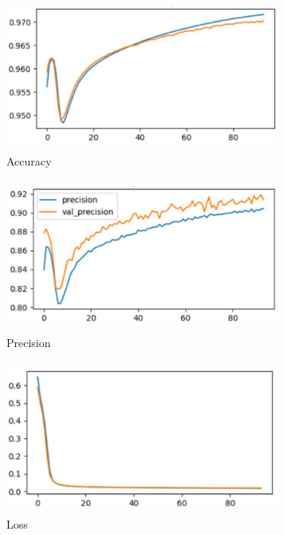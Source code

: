 \documentclass[12pt,a4paper,openright,twoside]{book}
\begin{document}
\begin{figure}[H]
    	\centering
    	\includegraphics[height=5cm,width=9cm]{figures/accuracy.pdf}
    	\caption{Accuracy}
	\label{fig:accuracy}
\end{figure}
\begin{figure}[H]
    	\centering
    	\includegraphics[height=5cm,width=9cm]{figures/precision.pdf}
    	\caption{Precision}
	\label{fig:precision}
\end{figure}
\begin{figure}[H]
    	\centering
   	\includegraphics[height=5cm,width=9cm]{figures/loss.pdf}
    	\caption{Loss}
	\label{fig:loss}
\end{figure}
\end{document}
